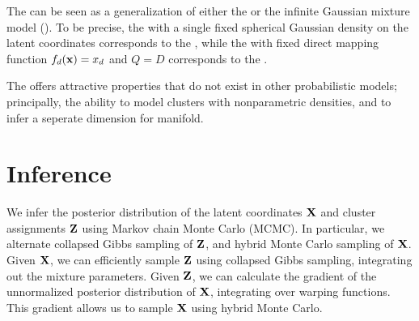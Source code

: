 The \iwmm{} can be seen as a generalization of either the \gplvm{} or the infinite Gaussian mixture model (\iGMM{}).
To be precise, the \iwmm{} with a single fixed spherical Gaussian density on the latent coordinates corresponds to the \gplvm{}, while the \iwmm{} with fixed direct mapping function $f_{d}({\bf{x}})=x_{d}$ and 
$Q=D$ corresponds to the \iGMM{}.

The \iwmm{} offers attractive properties that do not exist in other probabilistic models; principally, the ability to model clusters with nonparametric densities, and to infer a seperate dimension for manifold.





\section{Inference}

We infer the posterior distribution of the latent coordinates $\mathbf{X}$ and cluster assignments $\mathbf{Z}$ using Markov chain Monte Carlo (MCMC).
In particular, we alternate collapsed Gibbs sampling of $\mathbf{Z}$, and hybrid Monte Carlo sampling of $\mathbf{X}$.
Given $\mathbf{X}$,
we can efficiently sample $\mathbf{Z}$ using collapsed Gibbs sampling, integrating out the mixture parameters.
Given $\mathbf{Z}$, we can calculate the gradient of the unnormalized posterior distribution of $\mathbf{X}$, integrating over warping functions.
This gradient allows us to sample $\mathbf{X}$ using hybrid Monte Carlo.

